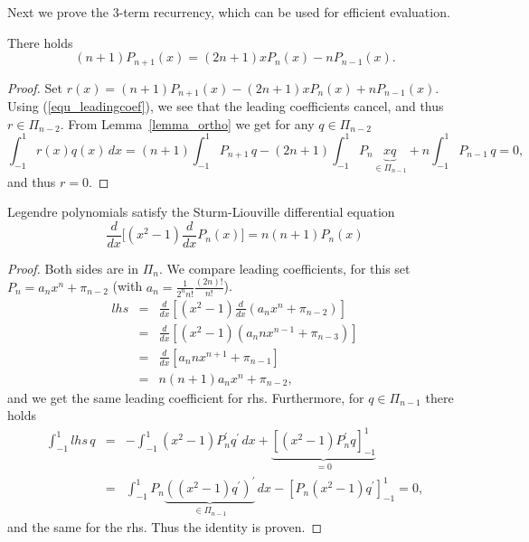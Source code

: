 Next we prove the 3-term recurrency, which can be used for efficient evaluation.
\begin{lemma} \label{lemma_threeterm} There holds
\begin{equation} \label{equ_threeterm}
(n+1) P_{n+1} (x) = (2n+1) x P_n(x) - n P_{n-1}(x).
\end{equation}
\end{lemma}
\begin{proof} Set $r(x) = (n+1) P_{n+1} (x) - (2n+1) x P_n(x) + n P_{n-1}(x)$.
Using (\ref{equ_leadingcoef}), we see that the leading coefficients cancel, 
and thus $r \in \Pi_{n-2}$. From Lemma~\ref{lemma_ortho} we get for 
any $q \in \Pi_{n-2}$
$$
\int_{-1}^1 r(x) q(x) \, dx = (n+1) \int_{-1}^1 P_{n+1} \, q - (2n+1) \int_{-1}^1 P_n \underbrace{x q}_{\in \Pi_{n-1}} + n \int_{-1}^1 P_{n-1} \, q = 0,
$$
and thus $r = 0$. 
\end{proof} 

\begin{lemma} \label{lemma_sturmliouville} Legendre polynomials satisfy the Sturm-Liouville differential equation
$$
\frac{d}{dx} \big[ (x^2-1) \frac{d}{dx} P_n(x) \big] = n (n+1) P_n(x)
$$
\end{lemma} 
\begin{proof} Both sides are in $\Pi_n$. We compare leading coefficients, for this set $P_n = a_n x^n + \pi_{n-2}$ (with $a_n =  \frac{1}{2^n n!} \frac{ (2n)! }{ n! }$).
\begin{eqnarray*}
lhs & = & \frac{d}{dx} \left[ (x^2-1) \frac{d}{dx} \left( a_n x^n + \pi_{n-2} \right) \right] \\
& = & \frac{d}{dx} \left[ (x^2-1) (a_n n x^{n-1} + \pi_{n-3}) \right] \\
& = & \frac{d}{dx} \left[ a_n n x^{n+1} + \pi_{n-1} \right] \\
& = & n (n+1) a_n x^n + \pi_{n-2}, 
\end{eqnarray*}
and we get the same leading coefficient for rhs. Furthermore, for $q \in \Pi_{n-1}$ there holds
\begin{eqnarray*}
\int_{-1}^1 lhs \, q & = &-\int_{-1}^1 (x^2-1) P_n^\prime q^\prime \, dx + \underbrace{ \left[ (x^2-1) P_n^\prime q \right]_{-1}^1 }_{= 0} \\
& = & \int_{-1}^1 P_n \underbrace{ \left( (x^2-1) q^\prime\right)^\prime}_{\in \Pi_{n-1}} \, dx - \left[ P_n (x^2-1) q^\prime \right]_{-1}^1 = 0,
\end{eqnarray*}
and the same for the rhs. Thus the identity is proven.
\end{proof}


